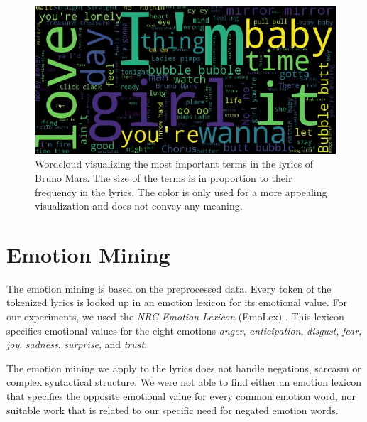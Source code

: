\documentclass[10pt,a4paper]{article}
\begin{document}
	\begin{figure}[htb]
		\centering
		\includegraphics[width=\linewidth]{data/wordcloud}
		\caption{Wordcloud visualizing the most important terms in the lyrics of Bruno Mars. The size of the terms is in proportion to their frequency in the lyrics. The color is only used for a more appealing visualization and does not convey any meaning.}
		\label{fig:wordcloud}
	\end{figure}
	
	
	\section{Emotion Mining}
	\label{sec:emotionmining}
	
	The emotion mining is based on the preprocessed data. Every token of the tokenized lyrics is looked up in an emotion lexicon for its emotional value. For our experiments, we used the \textit{NRC Emotion Lexicon} (EmoLex) \cite{emolex}. This lexicon specifies emotional values for the eight emotions \textit{anger}, \textit{anticipation}, \textit{disgust}, \textit{fear}, \textit{joy}, \textit{sadness}, \textit{surprise}, and \textit{trust}.
	
	The emotion mining we apply to the lyrics does not handle negations, sarcasm or complex syntactical structure. We were not able to find either an emotion lexicon that specifies the opposite emotional value for every common emotion word, nor suitable work that is related to our specific need for negated emotion words.
	
\end{document}
